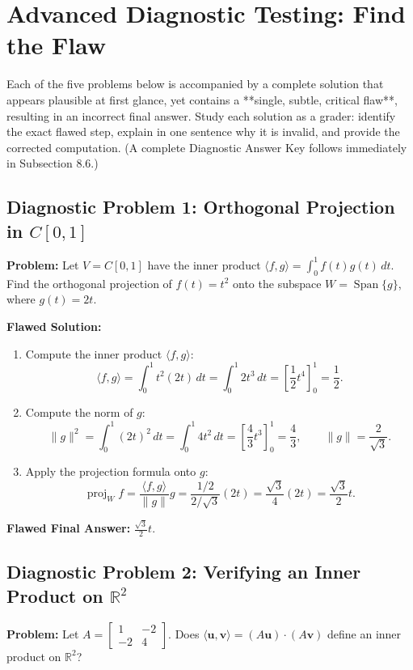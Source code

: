\documentclass[11pt, letterpaper]{article}
\theoremstyle{definition}
\theoremstyle{remark}
\begin{document}
\newpage
\section{Advanced Diagnostic Testing: Find the Flaw}

Each of the five problems below is accompanied by a complete solution that appears plausible at first glance, yet contains a **single, subtle, critical flaw**, resulting in an incorrect final answer. Study each solution as a grader: identify the exact flawed step, explain in one sentence why it is invalid, and provide the corrected computation. (A complete Diagnostic Answer Key follows immediately in Subsection 8.6.)

\subsection{Diagnostic Problem 1: Orthogonal Projection in $C[0, 1]$}

\textbf{Problem:} Let $V = C[0, 1]$ have the inner product $\langle f, g \rangle = \int_0^1 f(t)g(t)\,dt$. Find the orthogonal projection of $f(t) = t^2$ onto the subspace $W = \operatorname{Span}\{g\}$, where $g(t) = 2t$.

\textbf{Flawed Solution:}
\begin{enumerate}
    \item Compute the inner product $\langle f, g \rangle$:
    \[
        \langle f, g \rangle = \int_0^1 t^2 (2t)\,dt = \int_0^1 2t^3\,dt = \left[\frac{1}{2}t^4\right]_0^1 = \frac{1}{2}.
    \]
    \item Compute the norm of $g$:
    \[
        \|g\|^2 = \int_0^1 (2t)^2\,dt = \int_0^1 4t^2\,dt = \left[\frac{4}{3}t^3\right]_0^1 = \frac{4}{3}, \qquad \|g\| = \frac{2}{\sqrt{3}}.
    \]
    \item Apply the projection formula onto $g$:
    \[
        \operatorname{proj}_W f = \frac{\langle f, g \rangle}{\|g\|} g = \frac{1/2}{2/\sqrt{3}}(2t) = \frac{\sqrt{3}}{4}(2t) = \frac{\sqrt{3}}{2}t.
    \]
\end{enumerate}
\textbf{Flawed Final Answer:} $\displaystyle \frac{\sqrt{3}}{2}t$.

\subsection{Diagnostic Problem 2: Verifying an Inner Product on $\mathbb{R}^2$}

\textbf{Problem:} Let $A = \begin{bmatrix} 1 & -2 \\ -2 & 4 \end{bmatrix}$. Does $\langle \mathbf{u}, \mathbf{v} \rangle = (A\mathbf{u}) \cdot (A\mathbf{v})$ define an inner product on $\mathbb{R}^2$?
\end{document}
